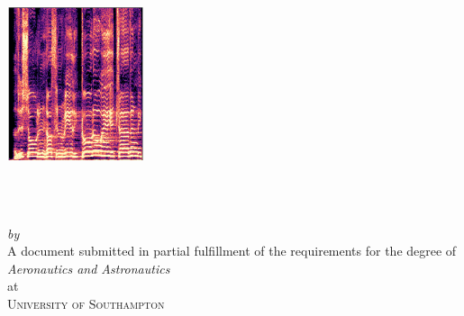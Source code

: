 \begin{titlepage}
  \vspace*{2cm}
  \makeatletter
  \centering
  \includegraphics[width=0.3\textwidth]{frontmatter/TitleSpectrogram.png}
  \vspace*{2cm}
  \begin{center}
    \begin{Huge}
      \@title
    \end{Huge}\\[0.1cm]
    \vspace*{1cm}
    \begin{Large}
      \@subtitle
    \end{Large}\\
    \emph{by}\\
    \@author \space {}
    \vfill
    A document submitted in partial fulfillment
    of the requirements for the degree of\\
    \emph{Aeronautics and Astronautics}\\
    at\\
    \textsc{University of Southampton}\\
  \end{center}
  \makeatother
\end{titlepage}

\newpage
\null
\thispagestyle{empty}
\newpage
